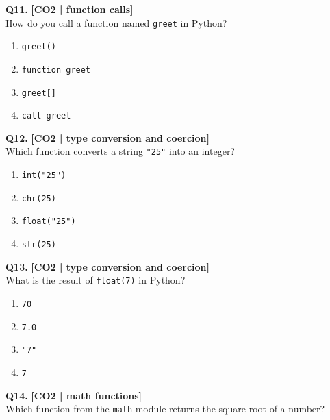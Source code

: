\noindent\textbf{Q11.} \hfill {\small\color{LPUOrange}\textbf{[CO2 | function calls]}}\\[2pt]
How do you call a function named \texttt{greet} in Python?

\begin{enumerate}[label=(\alph*),topsep=2pt,itemsep=1pt,partopsep=0pt,parsep=0pt]
    \item \relax \texttt{greet()}
    \item \relax \texttt{function greet}
    \item \relax \texttt{greet[]}
    \item \relax \texttt{call greet}
\end{enumerate}
\vspace{{2mm}}

\noindent\textbf{Q12.} \hfill {\small\color{LPUOrange}\textbf{[CO2 | type conversion and coercion]}}\\[2pt]
Which function converts a string \texttt{"25"} into an integer?

\begin{enumerate}[label=(\alph*),topsep=2pt,itemsep=1pt,partopsep=0pt,parsep=0pt]
    \item \relax \texttt{int("25")}
    \item \relax \texttt{chr(25)}
    \item \relax \texttt{float("25")}
    \item \relax \texttt{str(25)}
\end{enumerate}
\vspace{{2mm}}

\noindent\textbf{Q13.} \hfill {\small\color{LPUOrange}\textbf{[CO2 | type conversion and coercion]}}\\[2pt]
What is the result of \texttt{float(7)} in Python?

\begin{enumerate}[label=(\alph*),topsep=2pt,itemsep=1pt,partopsep=0pt,parsep=0pt]
    \item \relax \texttt{70}
    \item \relax \texttt{7.0}
    \item \relax \texttt{"7"}
    \item \relax \texttt{7}
\end{enumerate}
\vspace{{2mm}}

\noindent\textbf{Q14.} \hfill {\small\color{LPUOrange}\textbf{[CO2 | math functions]}}\\[2pt]
Which function from the \texttt{math} module returns the square root of a number?

